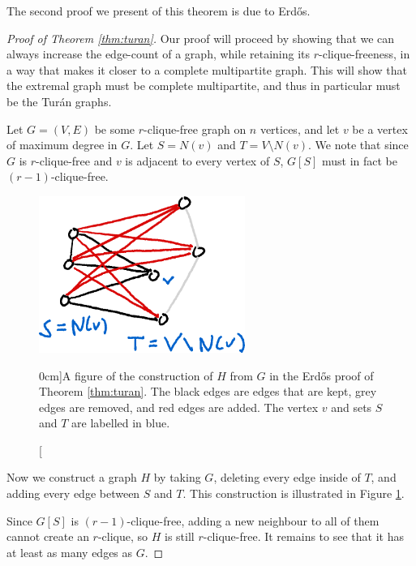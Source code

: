 \documentclass[nobib]{tufte-handout}
\begin{document}
The second proof we present of this theorem is due to Erd\H{o}s.

\begin{proof}[Proof of Theorem \ref{thm:turan}]
    Our proof will proceed by showing that we can always increase the edge-count of a graph, while retaining its $r$-clique-freeness, in a way that makes it closer to a complete multipartite graph. This will show that the extremal graph must be complete multipartite, and thus in particular must be the Turán graphs.

    Let $G = (V,E)$ be some $r$-clique-free graph on $n$ vertices, and let $v$ be a vertex of maximum degree in $G$. Let $S = N(v)$ and $T = V \setminus N(v)$. We note that since $G$ is $r$-clique-free and $v$ is adjacent to every vertex of $S$, $G[S]$ must in fact be $(r-1)$-clique-free.

    \begin{figure}
        \centering
        \includegraphics[width=0.6\textwidth]{graphics/L18_extremal_szemeredi/erdos_turan_proof.png}
        \caption[][0cm]{A figure of the construction of $H$ from $G$ in the Erd\H{o}s proof of Theorem \ref{thm:turan}. The black edges are edges that are kept, grey edges are removed, and red edges are added. The vertex $v$ and sets $S$ and $T$ are labelled in blue.}
        \label{fig:erdos_turan_proof}
    \end{figure}

    Now we construct a graph $H$ by taking $G$, deleting every edge inside of $T$, and adding every edge between $S$ and $T$. This construction is illustrated in Figure \ref{fig:erdos_turan_proof}.

    Since $G[S]$ is $(r-1)$-clique-free, adding a new neighbour to all of them cannot create an $r$-clique, so $H$ is still $r$-clique-free. It remains to see that it has at least as many edges as $G$.


\end{proof}
\end{document}
